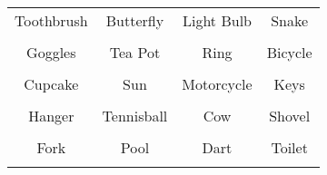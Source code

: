 \documentclass[12pt,a4paper]{article}
\begin{document}
\thispagestyle{empty}
\begin{table}[]
\centering
\Huge
\begin{tabular}{cccc}
 Toothbrush& Butterfly& Light Bulb& Snake\\  & & & \\
 Goggles& Tea Pot& Ring& Bicycle\\  & & & \\
 Cupcake& Sun& Motorcycle& Keys\\  & & & \\
 Hanger& Tennisball& Cow& Shovel\\  & & & \\
 Fork& Pool& Dart& Toilet\\  & & & \\
\end{tabular}
\end{table}
\end{document}
